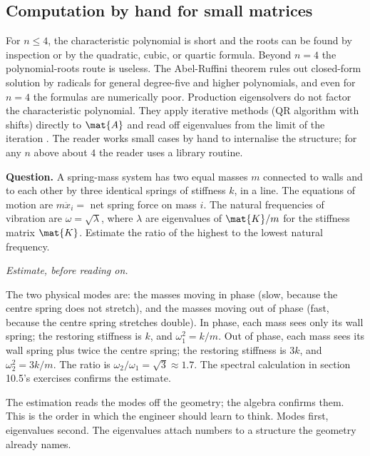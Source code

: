 \subsection{Computation by hand for small matrices}

For $n \leq 4$, the characteristic polynomial is short and the
roots can be found by inspection or by the quadratic, cubic, or
quartic formula. Beyond $n = 4$ the polynomial-roots route is
useless. The Abel-Ruffini theorem rules out closed-form solution by
radicals for general degree-five and higher polynomials, and even
for $n = 4$ the formulas are numerically poor. Production
eigensolvers do not factor the characteristic polynomial. They
apply iterative methods (QR algorithm with shifts) directly to
$\mat{A}$ and read off eigenvalues from the limit of the iteration
\cite[ch.~25]{text:trefethen-bau1997}. The reader works small cases
by hand to internalise the structure; for any $n$ above about $4$
the reader uses a library routine.

\begin{estimation}
\textbf{Question.} A spring-mass system has two equal masses $m$
connected to walls and to each other by three identical springs of
stiffness $k$, in a line. The equations of motion are
$m \ddot{x}_{i} = $ net spring force on mass $i$. The natural
frequencies of vibration are $\omega = \sqrt{\lambda}$, where
$\lambda$ are eigenvalues of $\mat{K}/m$ for the stiffness matrix
$\mat{K}$. Estimate the ratio of the highest to the lowest natural
frequency.

\smallskip
\textit{Estimate, before reading on.}

\smallskip
The two physical modes are: the masses moving in phase (slow,
because the centre spring does not stretch), and the masses moving
out of phase (fast, because the centre spring stretches double). In
phase, each mass sees only its wall spring; the restoring stiffness
is $k$, and $\omega_{1}^{2} = k/m$. Out of phase, each mass sees
its wall spring plus twice the centre spring; the restoring stiffness
is $3k$, and $\omega_{2}^{2} = 3k/m$. The ratio is
$\omega_{2}/\omega_{1} = \sqrt{3} \approx 1.7$. The spectral
calculation in section 10.5's exercises confirms the estimate.
\end{estimation}

The estimation reads the modes off the geometry; the algebra
confirms them. This is the order in which the engineer should learn
to think. Modes first, eigenvalues second. The eigenvalues attach
numbers to a structure the geometry already names.

